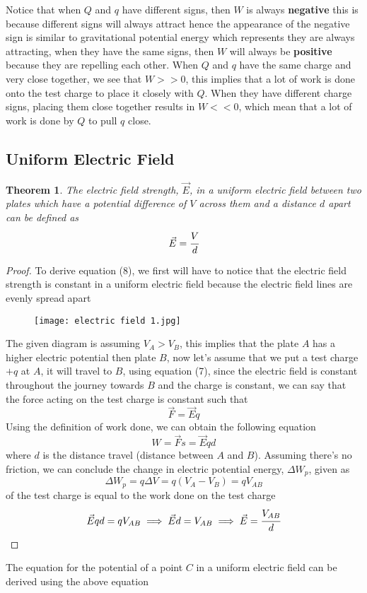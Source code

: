 \documentclass{article}
\newtheorem{theorem}{Theorem}[subsection]
\begin{document}
Notice that when $Q$ and $q$ have different signs, then $W$ is always \textbf{negative} this is because different signs will always attract hence the  appearance of the negative sign is similar to gravitational potential energy which represents they are always attracting, when they have the same signs, then $W$ will always be \textbf{positive} because they are repelling each other. When $Q$ and $q$ have the same charge and very close together, we see that $W>>0$, this implies that a lot of work is done onto the test charge to place it closely with $Q$. When they have different charge signs, placing them close together results in $W<<0$, which mean that a lot of work is done by $Q$ to pull $q$ close.


\subsection{Uniform Electric Field}
\begin{theorem}
The electric field strength, $\vec{E}$, in a uniform electric field between two plates which have a potential difference of $V$ across them and a distance $d$ apart can be defined as 
$$\vec{E}=\cfrac{V}{d}$$
\end{theorem}
\begin{proof}
To derive equation (8), we first will have to notice that the electric field strength is constant in a uniform electric field because the electric field lines are evenly spread apart 

\begin{figure}[H]
    \centering
    \texttt{[image: electric field 1.jpg]}
\end{figure}
The given diagram is assuming $V_A>V_B$, this implies that the plate $A$ has a higher electric potential then plate $B$, now let's assume that we put a test charge $+q$ at $A$, it will travel to $B$, using equation (7), since the electric field is constant throughout the journey towards $B$ and the charge is constant, we can say that the force acting on the test charge is constant such that 
$$\vec{F}=\vec{E}q$$
Using the definition of work done, we can obtain the following equation
$$W=\vec{F}s=\vec{E}qd$$
where $d$ is the distance travel (distance between $A$ and $B$). Assuming there's no friction, we can conclude the change in electric potential energy, $
\Delta W_p$, given as 
$$\Delta W_p=q\Delta V=q(V_A-V_B)=qV_{AB}$$
of the test charge is equal to the work done on the test charge
$$\vec{E}qd=qV_{AB} \implies \vec{E}d=V_{AB}\implies \vec{E}=\cfrac{V_{AB}}{d}$$
\end{proof}
The equation for the potential of a point $C$ in a uniform electric field can be derived using the above equation
\end{document}
